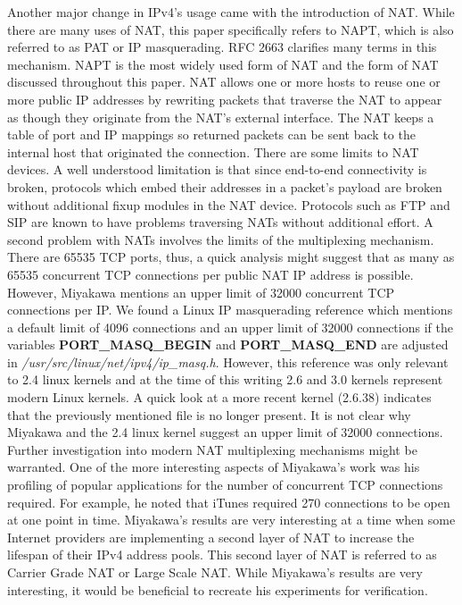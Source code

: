 Another major change in IPv4's usage came with the introduction of 
NAT. While there are many uses of NAT, this
paper specifically refers to NAPT, which is also referred to as PAT
or IP masquerading.  RFC 2663 clarifies many terms in this 
mechanism. NAPT is the most widely used form of NAT and
the form of NAT discussed throughout this paper.  NAT allows one
or more hosts to reuse one or more public IP addresses by rewriting
packets that traverse the NAT to appear as though they originate from
the NAT's external interface.  The NAT keeps a table of port and
IP mappings so returned packets can be sent back to the internal
host that originated the connection.  There are some limits to
NAT devices.  A well understood limitation is that since end-to-end
connectivity is broken, protocols which embed their addresses in a
packet's payload are broken without additional fixup modules in the
NAT device.  Protocols such as FTP and SIP are known to have problems
traversing NATs without additional effort.   A second
problem with NATs involves the limits of the multiplexing mechanism.
There are 65535 TCP ports, thus, a quick analysis might suggest that
as many as 65535 concurrent TCP connections per public NAT IP address
is possible.  However, Miyakawa mentions an upper limit of 32000
concurrent TCP connections per IP\cite{Apnic03}.  We found a Linux
IP masquerading reference which mentions a default limit of 4096
connections and an upper limit of 32000 connections if the variables
\textbf{PORT\_MASQ\_BEGIN} and \textbf{PORT\_MASQ\_END} are adjusted
in \textit{/usr/src/linux/net/ipv4/ip\_masq.h}.  However,
this reference was only relevant to 2.4 linux kernels and at the time
of this writing 2.6 and 3.0 kernels represent modern Linux kernels.
A quick look at a more recent kernel (2.6.38) indicates that the
previously mentioned file is no longer present.  It is not clear why
Miyakawa and the 2.4 linux kernel suggest an upper limit of 32000
connections.  Further investigation into modern NAT multiplexing
mechanisms might be warranted.  One of the more interesting aspects
of Miyakawa's work was his profiling of popular applications
for the number of concurrent TCP connections required\cite{Apnic03}.
For example, he noted that iTunes required 270 connections to be
open at one point in time.  Miyakawa's results are very interesting
at a time when some Internet providers are implementing a second
layer of NAT to increase the lifespan of their IPv4 address pools.
This second layer of NAT is referred to as Carrier Grade NAT or
Large Scale NAT.  While Miyakawa's results are very interesting,
it would be beneficial to recreate his experiments for verification.


